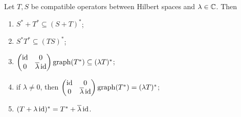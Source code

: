 \begin{proposition} \label{adjointAlgebraicProperties}
Let $T,S$ be compatible operators between Hilbert spaces and $\lambda\in\mathbb{C}$. Then
\begin{enumerate}
\item $S^* + T^* \subseteq (S+T)^*$;
\item $S^*T^* \subseteq (TS)^*$;
\item $\begin{pmatrix}
\operatorname{id} & 0 \\ 0 & \overline{\lambda}\operatorname{id}
\end{pmatrix} \operatorname{graph}(T^*) \subseteq (\lambda T)^*$;
\item if $\lambda \neq 0$, then $\begin{pmatrix}
\operatorname{id} & 0 \\ 0 & \overline{\lambda}\operatorname{id}
\end{pmatrix} \operatorname{graph}(T^*) = (\lambda T)^*$;
\item $(T+\lambda\operatorname{id})^* = T^*+\overline{\lambda}\operatorname{id}$.
\end{enumerate}
\end{proposition}
